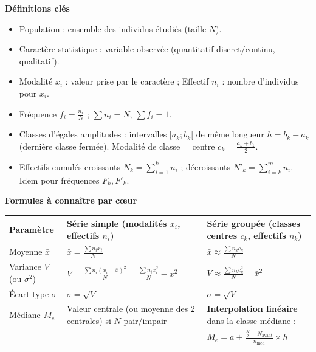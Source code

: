 \documentclass[11pt]{article}
\newcommand{\cle}[1]{{\popxbold\color{popdark}#1}}
\begin{document}
\begin{bilan}

\textbf{Définitions clés}
\begin{itemize}
    \item \cle{Population} : ensemble des individus étudiés (taille $N$).
    \item \cle{Caractère statistique} : variable observée (quantitatif discret/continu, qualitatif).
    \item \cle{Modalité} $x_i$ : valeur prise par le caractère ; \cle{Effectif} $n_i$ : nombre d'individus pour $x_i$.
    \item \cle{Fréquence} $f_i = \frac{n_i}{N}$ ; $\sum n_i = N$, $\sum f_i = 1$.
    \item \cle{Classes d'égales amplitudes} : intervalles $[a_k; b_k[$ de même longueur $h = b_k - a_k$ (dernière classe fermée). \cle{Modalité de classe} = centre $c_k = \frac{a_k+b_k}{2}$.
    \item \cle{Effectifs cumulés croissants} $N_k = \sum_{i=1}^k n_i$ ; \cle{décroissants} $N'_k = \sum_{i=k}^m n_i$. Idem pour fréquences $F_k, F'_k$.
\end{itemize}

\textbf{Formules à connaître par cœur}
\begin{center}
\begin{tabularx}{\linewidth}{|l|X|X|}\hline
\rowcolor{popblueL} \textbf{Paramètre} & \textbf{Série simple (modalités $x_i$, effectifs $n_i$)} & \textbf{Série groupée (classes centres $c_k$, effectifs $n_k$)} \\ \hline
Moyenne $\bar{x}$ & $\displaystyle \bar{x} = \frac{\sum n_i x_i}{N}$ & $\displaystyle \bar{x} \approx \frac{\sum n_k c_k}{N}$ \\ \hline
Variance $V$ (ou $\sigma^2$) & $\displaystyle V = \frac{\sum n_i (x_i-\bar{x})^2}{N} = \frac{\sum n_i x_i^2}{N} - \bar{x}^2$ & $\displaystyle V \approx \frac{\sum n_k c_k^2}{N} - \bar{x}^2$ \\ \hline
Écart-type $\sigma$ & $\sigma = \sqrt{V}$ & $\sigma = \sqrt{V}$ \\ \hline
Médiane $M_e$ & Valeur centrale (ou moyenne des 2 centrales) si $N$ pair/impair & \textbf{Interpolation linéaire} dans la classe médiane : \\
& & $M_e = a + \frac{\frac{N}{2} - N_{\text{avant}}}{n_{\text{méd}}} \times h$ \\ \hline
\end{tabularx}
\end{center}


\end{bilan}
\end{document}
